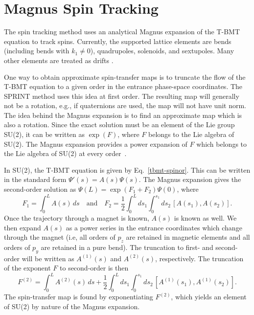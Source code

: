 \section{Magnus Spin Tracking}
\label{s:magnus}

The  spin tracking method uses an analytical Magnus expansion of the T-BMT equation to
track spins.  Currently, the supported lattice elements are bends (including bends with $k_1 \neq
0$), quadrupoles, solenoids, and sextupoles.  Many other elements are treated as drifts
.

One way to obtain approximate spin-transfer maps is to truncate the flow of the T-BMT equation to a
given order in the entrance phase-space coordinates.  The SPRINT method  uses
this idea at first order. The resulting map will generally not be a rotation, e.g., if quaternions
are used, the map will not have unit norm. The idea behind the Magnus expansion is to find an
approximate map which is also a rotation. Since the exact solution must be an element of the Lie
group SU(2), it can be written as $\exp(F)$, where $F$ belongs to the Lie algebra of SU(2). The
Magnus expansion provides a power expansion of $F$ which belongs to the Lie algebra of SU(2) at
every order~\cite{b:magnus}.

In SU(2), the T-BMT equation is given by Eq.~\eqref{tbmt-spinor}. This can be written in the
standard form $\Psi'(s)=A(s)\Psi(s)$. The Magnus expansion gives the second-order solution as
$\Psi(L)=\exp(F_1+F_2)\Psi(0)$, where
\begin{equation}
F_1 = \int_0^LA(s)\,ds \quad \mathrm{and} \quad F_2=\frac{1}{2}\int_0^Lds_1\int_0^{s_1}ds_2\,[A(s_1),A(s_2)].
\end{equation}
Once the trajectory through a magnet is known, $A(s)$ is known as well. We then expand $A(s)$ as a
power series in the entrance coordinates which change through the magnet (i.e, all orders of $p_z$
are retained in magnetic elements and all orders of $p_y$ are retained in a pure bend). The
truncation to first- and second-order will be written as $A^{(1)}(s)$ and $A^{(2)}(s)$,
respectively. The truncation of the exponent $F$ to second-order is then
\begin{equation}
F^{(2)}=\int_0^LA^{(2)}(s)\,ds+\frac{1}{2}\int_0^Lds_1\int_0^{s_1}ds_2\,[A^{(1)}(s_1),A^{(1)}(s_2)].
\end{equation}
The spin-transfer map is found by exponentiating $F^{(2)}$, which yields an element of SU(2) by
nature of the Magnus expansion.


